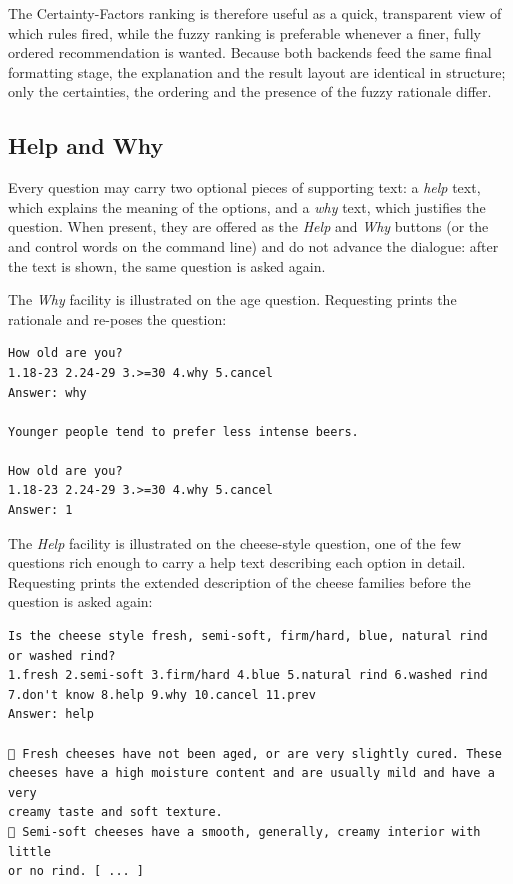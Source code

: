 The Certainty-Factors ranking is therefore useful as a quick, transparent view of
which rules fired, while the fuzzy ranking is preferable whenever a finer, fully
ordered recommendation is wanted. Because both backends feed the same final
formatting stage, the explanation and the result layout are identical in
structure; only the certainties, the ordering and the presence of the fuzzy
rationale differ.


\subsection{Help and Why}

Every question may carry two optional pieces of supporting text: a \emph{help}
text, which explains the meaning of the options, and a \emph{why} text, which
justifies the question. When present, they are offered as the \emph{Help} and
\emph{Why} buttons (or the  and  control words on the
command line) and do not advance the dialogue: after the text is shown, the same
question is asked again.

The \emph{Why} facility is illustrated on the age question. Requesting 
prints the rationale and re-poses the question:

\begin{lstlisting}[numbers=none]
How old are you?
1.18-23 2.24-29 3.>=30 4.why 5.cancel
Answer: why

Younger people tend to prefer less intense beers.

How old are you?
1.18-23 2.24-29 3.>=30 4.why 5.cancel
Answer: 1
\end{lstlisting}

The \emph{Help} facility is illustrated on the cheese-style question, one of the
few questions rich enough to carry a help text describing each option in detail.
Requesting  prints the extended description of the cheese families
before the question is asked again:

\begin{lstlisting}[numbers=none]
Is the cheese style fresh, semi-soft, firm/hard, blue, natural rind
or washed rind?
1.fresh 2.semi-soft 3.firm/hard 4.blue 5.natural rind 6.washed rind
7.don't know 8.help 9.why 10.cancel 11.prev
Answer: help

🧀 Fresh cheeses have not been aged, or are very slightly cured. These
cheeses have a high moisture content and are usually mild and have a very
creamy taste and soft texture.
🧀 Semi-soft cheeses have a smooth, generally, creamy interior with little
or no rind. [ ... ]
\end{lstlisting}

